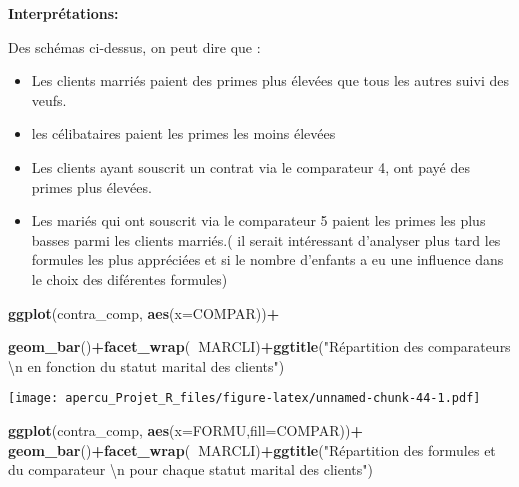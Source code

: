 \documentclass[
]{article}
\newenvironment{Shaded}{\begin{snugshade}}{\end{snugshade}}
\newcommand{\CharTok}[1]{\textcolor[rgb]{0.31,0.60,0.02}{#1}}
\newcommand{\DataTypeTok}[1]{\textcolor[rgb]{0.13,0.29,0.53}{#1}}
\newcommand{\KeywordTok}[1]{\textcolor[rgb]{0.13,0.29,0.53}{\textbf{#1}}}
\newcommand{\NormalTok}[1]{#1}
\newcommand{\OperatorTok}[1]{\textcolor[rgb]{0.81,0.36,0.00}{\textbf{#1}}}
\newcommand{\StringTok}[1]{\textcolor[rgb]{0.31,0.60,0.02}{#1}}
\begin{document}
\textbf{Interprétations:}

Des schémas ci-dessus, on peut dire que :

\begin{itemize}
\item
  Les clients marriés paient des primes plus élevées que tous les autres
  suivi des veufs.
\item
  les célibataires paient les primes les moins élevées
\item
  Les clients ayant souscrit un contrat via le comparateur 4, ont payé
  des primes plus élevées.
\item
  Les mariés qui ont souscrit via le comparateur 5 paient les primes les
  plus basses parmi les clients marriés.( il serait intéressant
  d'analyser plus tard les formules les plus appréciées et si le nombre
  d'enfants a eu une influence dans le choix des diférentes formules)
\end{itemize}

\begin{Shaded}
\begin{Highlighting}[]
\KeywordTok{ggplot}\NormalTok{(contra_comp, }\KeywordTok{aes}\NormalTok{(}\DataTypeTok{x=}\NormalTok{COMPAR))}\OperatorTok{+}

\KeywordTok{geom_bar}\NormalTok{()}\OperatorTok{+}\KeywordTok{facet_wrap}\NormalTok{(}\OperatorTok{~}\NormalTok{MARCLI)}\OperatorTok{+}\KeywordTok{ggtitle}\NormalTok{(}\StringTok{"Répartition des comparateurs }\CharTok{\textbackslash{}n}\StringTok{ en fonction du statut marital des clients"}\NormalTok{)}
\end{Highlighting}
\end{Shaded}

\texttt{[image: apercu\_Projet\_R\_files/figure-latex/unnamed-chunk-44-1.pdf]}

\begin{Shaded}
\begin{Highlighting}[]
\KeywordTok{ggplot}\NormalTok{(contra_comp, }\KeywordTok{aes}\NormalTok{(}\DataTypeTok{x=}\NormalTok{FORMU,}\DataTypeTok{fill=}\NormalTok{COMPAR))}\OperatorTok{+}
\KeywordTok{geom_bar}\NormalTok{()}\OperatorTok{+}\KeywordTok{facet_wrap}\NormalTok{(}\OperatorTok{~}\NormalTok{MARCLI)}\OperatorTok{+}\KeywordTok{ggtitle}\NormalTok{(}\StringTok{"Répartition des formules et du comparateur }\CharTok{\textbackslash{}n}\StringTok{ pour chaque statut marital des clients"}\NormalTok{)}
\end{Highlighting}
\end{Shaded}
\end{document}
